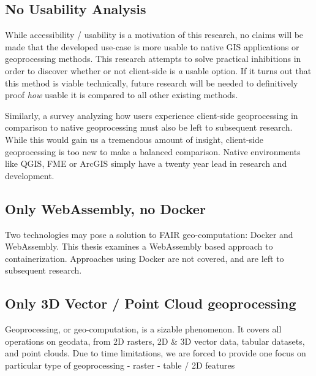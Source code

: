 \subsection*{ No Usability Analysis } %
While accessibility / usability is a motivation of this research, no claims will be made that the developed use-case is more usable to native GIS applications or geoprocessing methods. This research attempts to solve practical inhibitions in order to discover whether or not client-side is \emph{a} usable option. If it turns out that this method is viable technically, future research will be needed to definitively proof \emph{how} usable it is compared to all other existing methods.  


Similarly, a survey analyzing how users experience client-side geoprocessing in comparison to native geoprocessing must also be left to subsequent research. While this would gain us a tremendous amount of insight, client-side geoprocessing is too new to make a balanced comparison. Native environments like QGIS, FME or ArcGIS simply have a twenty year lead in research and development. 



\subsection {Only WebAssembly, no Docker}
Two technologies may pose a solution to FAIR geo-computation: Docker and WebAssembly.
This thesis examines a WebAssembly based approach to containerization. Approaches using Docker are not covered, and are left to subsequent research.

\subsection*{ Only 3D Vector / Point Cloud geoprocessing}
Geoprocessing, or geo-computation, is a sizable phenomenon. 
It covers all operations on geodata, from 2D rasters, 2D \& 3D vector data, tabular datasets, and point clouds. 
Due to time limitations, we are forced to provide one focus on particular type of geoprocessing
- raster
- table / 2D features

